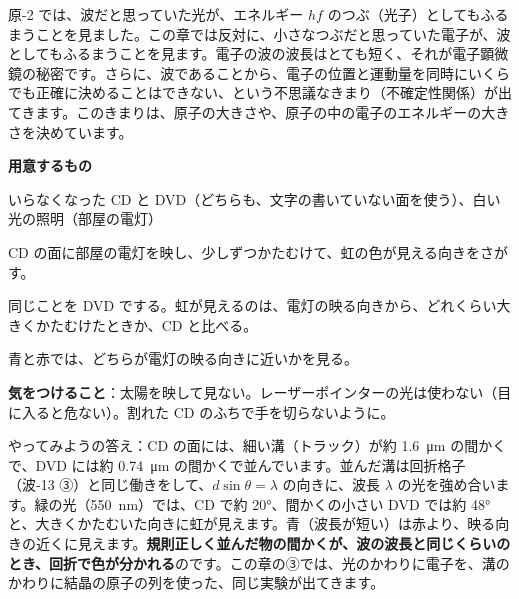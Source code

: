 \noindent 原-2 では、波だと思っていた光が、エネルギー $hf$ のつぶ（光子）としてもふるまうことを見ました。この章では反対に、小さなつぶだと思っていた電子が、波としてもふるまうことを見ます。電子の波の波長はとても短く、それが電子顕微鏡の秘密です。さらに、波であることから、電子の位置と運動量を同時にいくらでも正確に決めることはできない、という不思議なきまり（不確定性関係）が出てきます。このきまりは、原子の大きさや、原子の中の電子のエネルギーの大きさを決めています。

\begin{yattemiyou}
\textbf{用意するもの}\par
いらなくなった CD と DVD（どちらも、文字の書いていない面を使う）、白い光の照明（部屋の電灯）\par\vspace{2pt}
\begin{enumerate}[label={\bkcircled[bkGreen]{\arabic*}}, leftmargin=2.4\zw, itemsep=1pt, topsep=0pt]
\item CD の面に部屋の電灯を映し、少しずつかたむけて、虹の色が見える向きをさがす。
\item 同じことを DVD でする。虹が見えるのは、電灯の映る向きから、どれくらい大きくかたむけたときか、CD と比べる。
\item 青と赤では、どちらが電灯の映る向きに近いかを見る。
\end{enumerate}
\textbf{気をつけること}：太陽を映して見ない。レーザーポインターの光は使わない（目に入ると危ない）。割れた CD のふちで手を切らないように。
\end{yattemiyou}

\noindent やってみようの答え：CD の面には、細い溝（トラック）が約 \qty{1.6}{\micro m} の間かくで、DVD には約 \qty{0.74}{\micro m} の間かくで並んでいます。並んだ溝は回折格子（波-13 ③）と同じ働きをして、$d\sin\theta=\lambda$ の向きに、波長 $\lambda$ の光を強め合います。緑の光（\qty{550}{nm}）では、CD で約 20°、間かくの小さい DVD では約 48° と、大きくかたむいた向きに虹が見えます。青（波長が短い）は赤より、映る向きの近くに見えます。\textbf{規則正しく並んだ物の間かくが、波の波長と同じくらいのとき、回折で色が分かれる}のです。この章の③では、光のかわりに電子を、溝のかわりに結晶の原子の列を使った、同じ実験が出てきます。

\begin{omoidasou}
\end{omoidasou}

